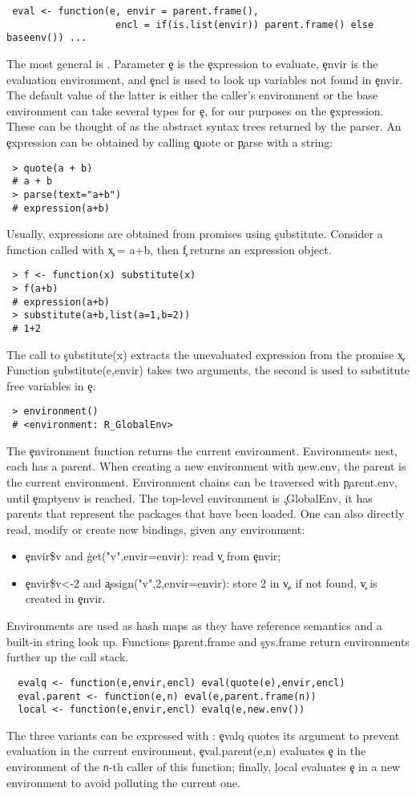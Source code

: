 \documentclass[review,screen,acmsmall,anonymous=true]{acmart}
\begin{document}
\begin{lstlisting}
 eval <- function(e, envir = parent.frame(),
                   encl = if(is.list(envir)) parent.frame() else baseenv()) ...
\end{lstlisting}
The most general is \eval. Parameter \c e is the \c{expression} to evaluate,
\c{envir} is the evaluation environment, and \c{encl} is used to look up
variables not found in \c{envir}. The default value of the latter is either the
caller's environment or the base environment \Eval can take several types for \c e, for
our purposes on the \c{expression}. These can be thought of as the abstract
syntax trees returned by the parser. An \c{expression} can be obtained by
calling \c{quote} or \c{parse} with a string:
\begin{lstlisting}
 > quote(a + b)
 # a + b
 > parse(text="a+b")
 # expression(a+b)
\end{lstlisting}
Usually, expressions are obtained from promises using \c{substitute}. Consider a
function called with \c{x = a+b}, then \c f returns an expression object.
\begin{lstlisting}
 > f <- function(x) substitute(x)
 > f(a+b)
 # expression(a+b)
 > substitute(a+b,list(a=1,b=2))
 # 1+2
\end{lstlisting}
The call to \c{substitute(x)} extracts the unevaluated expression from the
promise \c x. Function \c{substitute(e,envir)} takes two arguments, the second
is used to substitute free variables in \c e.
\begin{lstlisting}
 > environment()
 # <environment: R_GlobalEnv>
\end{lstlisting}
The \c{environment} function returns the current environment. Environments nest,
each has a parent. When creating a new environment with \c{new.env}, the parent
is the current environment. Environment chains can be traversed with
\c{parent.env}, until \c{emptyenv} is reached. The top-level environment is
\c{.GlobalEnv}, it has parents that represent the packages that have been
loaded. One can also directly read, modify or create new bindings, given any
environment:
\begin{itemize}
\item \c{envir\$v} and \c{get("v",envir=envir)}: read  \c{v} from \c{envir};
\item \c{envir\$v<-2} and \c{assign("v",2,envir=envir)}: store 2 in \c{v}, if
  not found, \c{v} is created in \c{envir}.
\end{itemize}
\noindent Environments are used as hash maps as they have reference semantics
and a built-in string look up. Functions \c{parent.frame} and \c{sys.frame}
return environments further up the call stack.
 \begin{lstlisting}
  evalq <- function(e,envir,encl) eval(quote(e),envir,encl)
  eval.parent <- function(e,n) eval(e,parent.frame(n))
  local <- function(e,envir,encl) evalq(e,new.env())
\end{lstlisting}
The three variants can be expressed with \eval: \c{evalq} quotes its
argument to prevent evaluation in the current environment,
\c{eval.parent(e,n)} evaluates \c{e} in the environment of the {\tt n}-th
caller of this function; finally, \c{local} evaluates \c{e} in a new environment
to avoid polluting the current one.
\end{document}
